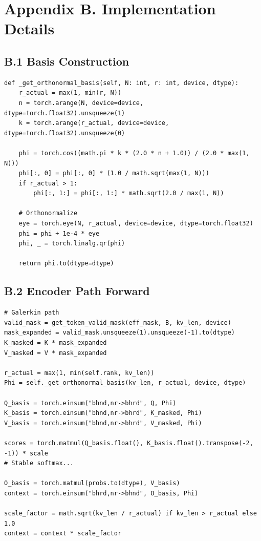 
\section{Appendix B. Implementation Details}

\subsection{B.1 Basis Construction}

\begin{lstlisting}
def _get_orthonormal_basis(self, N: int, r: int, device, dtype):
    r_actual = max(1, min(r, N))
    n = torch.arange(N, device=device, dtype=torch.float32).unsqueeze(1)
    k = torch.arange(r_actual, device=device, dtype=torch.float32).unsqueeze(0)
    
    phi = torch.cos((math.pi * k * (2.0 * n + 1.0)) / (2.0 * max(1, N)))
    phi[:, 0] = phi[:, 0] * (1.0 / math.sqrt(max(1, N)))
    if r_actual > 1:
        phi[:, 1:] = phi[:, 1:] * math.sqrt(2.0 / max(1, N))
    
    # Orthonormalize
    eye = torch.eye(N, r_actual, device=device, dtype=torch.float32)
    phi = phi + 1e-4 * eye
    phi, _ = torch.linalg.qr(phi)
    
    return phi.to(dtype=dtype)
\end{lstlisting}

\subsection{B.2 Encoder Path Forward}

\begin{lstlisting}
# Galerkin path
valid_mask = get_token_valid_mask(eff_mask, B, kv_len, device)
mask_expanded = valid_mask.unsqueeze(1).unsqueeze(-1).to(dtype)
K_masked = K * mask_expanded
V_masked = V * mask_expanded

r_actual = max(1, min(self.rank, kv_len))
Phi = self._get_orthonormal_basis(kv_len, r_actual, device, dtype)

Q_basis = torch.einsum("bhnd,nr->bhrd", Q, Phi)
K_basis = torch.einsum("bhnd,nr->bhrd", K_masked, Phi)
V_basis = torch.einsum("bhnd,nr->bhrd", V_masked, Phi)

scores = torch.matmul(Q_basis.float(), K_basis.float().transpose(-2, -1)) * scale
# Stable softmax...

O_basis = torch.matmul(probs.to(dtype), V_basis)
context = torch.einsum("bhrd,nr->bhnd", O_basis, Phi)

scale_factor = math.sqrt(kv_len / r_actual) if kv_len > r_actual else 1.0
context = context * scale_factor
\end{lstlisting}

